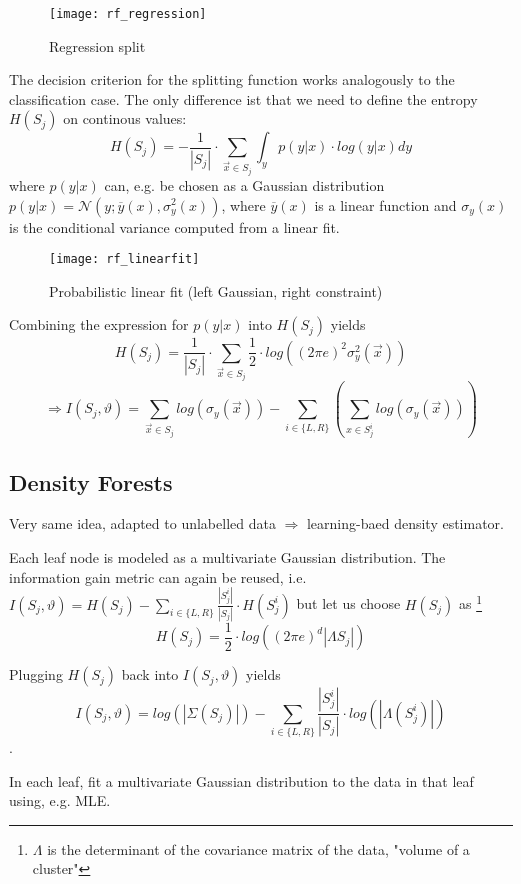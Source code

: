 \begin{figure}[ht]
	\centering
    \texttt{[image: rf\_regression]}
	\caption{Regression split}
\end{figure}

The decision criterion for the splitting function works analogously to the classification case. The only difference ist that we need to define the entropy \(H(S_j)\) on continous values:
\[H(S_j) = -\frac{1}{|S_j|} \cdot \sum_{\vec{x} \in S_j} \int_y p(y|x) \cdot log(y|x)dy\]
where \(p(y|x)\) can, e.g. be chosen as a Gaussian distribution \(p(y|x) = \mathcal{N}(y; \overline{y}(x), \sigma_y^2(x))\), where \(\overline{y}(x)\) is a linear function and \(\sigma_y(x)\) is the conditional variance computed from a linear fit.

\begin{figure}[H]
	\centering
    \texttt{[image: rf\_linearfit]}
    \caption{Probabilistic linear fit (left Gaussian, right constraint)}
\end{figure}

Combining the expression for \(p(y|x)\) into \(H(S_j)\) yields
\[H(S_j) = \frac{1}{|S_j|} \cdot \sum_{\vec{x} \in S_j} \frac{1}{2} \cdot log((2 \pi e)^2 \sigma_y^2(\vec{x}))\]
\[\Rightarrow I(S_j, \vartheta) = \sum_{\vec{x} \in S_j} log(\sigma_y(\vec{x})) - \sum_{i \in \{L, R\}} (\sum_{x \in S_j^i} log (\sigma_y(\vec{x}))) \]

\newpage
\subsection*{Density Forests}
Very same idea, adapted to unlabelled data $\Rightarrow$ learning-baed density estimator.

Each leaf node is modeled as a multivariate Gaussian distribution. The information gain metric can again be reused, i.e. \(I(S_j, \vartheta) = H(S_j) - \sum_{i \in \{L, R\}} \frac{|S_j^i|}{|S_j|} \cdot H(S_j^i)\) but let us choose \(H(S_j)\) as \footnote{$\Lambda$ is the determinant of the covariance matrix of the data, "volume of a cluster"}
\[
  H(S_j) = \frac{1}{2} \cdot log((2 \pi e)^d |\Lambda S_j|)
\]

Plugging \(H(S_j)\) back into \(I(S_j, \vartheta)\) yields
\[I(S_j, \vartheta) = log (|\Sigma(S_j)|) - \sum_{i \in \{L, R\}} \frac{|S_j^i|}{|S_j|} \cdot log(|\Lambda(S_j^i)|)\].

In each leaf, fit a multivariate Gaussian distribution to the data in that leaf using, e.g. MLE.

